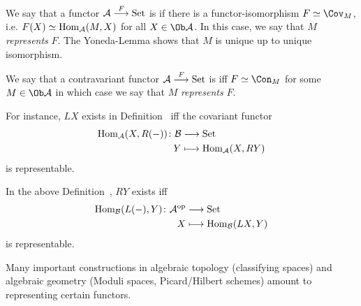 \documentclass[a4paper,parskip=half,numbers=enddot, DIV=12]{scrreprt}
\begin{document}
  \begin{defi}
  	\begin{alphanumerate}
  		\item We say that a functor $\Aa\morphism[F] \cat{Set}$ is  if there is a functor-isomorphism $F\simeq \Cov_M$, i.e. $F(X) \simeq \operatorname{Hom}_{\mathcal{A}}(M,X)$ for all $X\in\Ob\Aa$. In this case, we say that $M$ \emph{represents} $F$. The Yoneda-Lemma shows that $M$ is unique up to unique isomorphism.
  		\item We say that a contravariant functor $\Aa\morphism[F]\cat{Set}$ is  iff $F\simeq \Con_M$ for some $M\in\Ob\Aa$ in which case we say that $M$ \emph{represents} $F$.
  	\end{alphanumerate}
  \end{defi}
  \begin{rem*}
  	\begin{alphanumerate}
  		\item  For instance, $LX$ exists in Definition~ iff the covariant functor 
  		\begin{align*}
  		\Hom_\Aa(X,R(-))\colon\Bb&\morphism\cat{Set}\\
  		Y &\longmapsto \Hom_\Aa(X, RY)
  		\end{align*}
  		is representable.
  		\item
  		In the above Definition~, $RY$ exists iff 
  		\begin{align*}
  		\Hom_\Bb(L(-), Y)\colon\Aa^\op&\morphism\cat{Set}\\
  		X&\longmapsto \Hom_\Bb(LX,Y)
  		\end{align*}
  		is representable.
  		\item 
  		Many important constructions in algebraic topology (classifying spaces) and algebraic geometry (Moduli spaces, Picard/Hilbert schemes) amount to representing certain functors.
  	\end{alphanumerate}
  \end{rem*}
\end{document}
